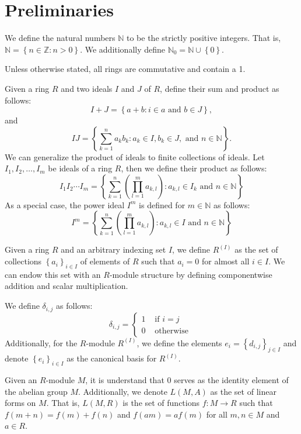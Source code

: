 \documentclass[12pt]{article}
\newcommand{\N}{\ensuremath{\mathbb{N}}}
\newcommand{\Z}{\ensuremath{\mathbb{Z}}}
\renewcommand{\d}{\ensuremath{\delta}}
\newcommand{\braceb}[1]{\left\{#1\right\}}
\newcommand{\parenb}[1]{\left(#1\right)}
\renewcommand{\t}[1]{\text{ #1 }}
\begin{document}
\pagestyle{fancy}

\setlength{\parindent}{0in}
\setlength{\parskip}{0.1in}

\section*{Preliminaries}

We define the natural numbers \( \N \) to be the strictly positive integers.
That is, \( \N = \braceb{n \in \Z : n > 0} \).
We additionally define \( \N_0 = \N \cup \braceb{0} \).

Unless otherwise stated, all rings are commutative and contain a 1.

Given a ring \( R \) and two ideals \( I \) and \( J \) of \( R \), define
their sum and product as follows:
\[
	I + J = \braceb{a + b : i \in a \t{and} b \in J},
\]
and
\[
	IJ = \braceb{
		\sum_{k = 1}^n a_kb_k : a_k \in I, b_k \in J, \t{and} n \in \N
	}.
\]
We can generalize the product of ideals to finite collections of ideals.
Let \( I_1, I_2, \dots, I_m \) be ideals of a ring \( R \), then we define
their product as follows:
\[
	I_1I_2 \cdots I_m = \braceb{
		\sum_{k = 1}^n \parenb{\prod_{l = 1}^m a_{k,l}}
		: a_{k,l} \in I_k \t{and} n \in \N
	}
\]
As a special case, the power ideal \( I^m \) is defined for \( m \in \N \) as
follows:
\[
	I^m = \braceb{
		\sum_{k = 1}^n \parenb{\prod_{l = 1}^m a_{k,l}}
		: a_{k,l} \in I \t{and} n \in \N
	}
\]

Given a ring \( R \) and an arbitrary indexing set \( I \), we define
\( R^{(I)} \) as the set of collections \( \braceb{a_i}_{i \in I} \) of
elements of \( R \) such that \( a_i = 0 \) for almost all \( i \in I \).
We can endow this set with an \( R \)-module structure by defining
componentwise addition and scalar multiplication.

We define \( \d_{i,j} \) as follows:
\[
	\d_{i,j} = \begin{cases}
		1 & \t{if} i = j  \\
		0 & \t{otherwise}
	\end{cases}
\]
Additionally, for the \( R \)-module \( R^{(I)} \), we define the elements
\( e_i = \braceb{d_{i,j}}_{j \in I} \) and denote
\( \braceb{e_i}_{i \in I} \) as the canonical basis for \( R^{(I)} \).

Given an \( R \)-module \( M \), it is understand that \( 0 \) serves as the
identity element of the abelian group \( M \).
Additionally, we denote \( L(M,A) \) as the set of linear forms on \( M \).
That is, \( L(M,R) \) is the set of functions \( f : M \to R \) such that
\( f(m + n) = f(m) + f(n) \) and \( f(am) = af(m) \) for all \( m, n \in M \)
and \( a \in R \).
\end{document}
